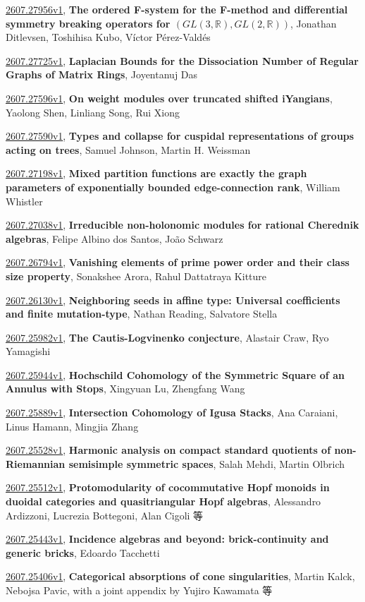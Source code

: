 \documentclass[9pt, a4paper]{article}
\theoremstyle{plain}
\theoremstyle{definition}
\theoremstyle{remark}
\newcommand{\arxiv}[3]{\href{https://arxiv.org/abs/#1}{#1}, \textbf{\textcolor{arxivblue}{#2}}, #3}
\begin{document}
\arxiv{2607.27956v1}{The ordered F-system for the F-method and differential symmetry breaking operators for $(GL(3,\mathbb{R}), GL(2,\mathbb{R}))$}{Jonathan Ditlevsen, Toshihisa Kubo, Víctor Pérez-Valdés}

\arxiv{2607.27725v1}{Laplacian Bounds for the Dissociation Number of Regular Graphs of Matrix Rings}{Joyentanuj Das}

\arxiv{2607.27596v1}{On weight modules over truncated shifted iYangians}{Yaolong Shen, Linliang Song, Rui Xiong}

\arxiv{2607.27590v1}{Types and collapse for cuspidal representations of groups acting on trees}{Samuel Johnson, Martin H. Weissman}

\arxiv{2607.27198v1}{Mixed partition functions are exactly the graph parameters of exponentially bounded edge-connection rank}{William Whistler}

\arxiv{2607.27038v1}{Irreducible non-holonomic modules for rational Cherednik algebras}{Felipe Albino dos Santos, João Schwarz}

\arxiv{2607.26794v1}{Vanishing elements of prime power order and their class size property}{Sonakshee Arora, Rahul Dattatraya Kitture}

\arxiv{2607.26130v1}{Neighboring seeds in affine type: Universal coefficients and finite mutation-type}{Nathan Reading, Salvatore Stella}

\arxiv{2607.25982v1}{The Cautis-Logvinenko conjecture}{Alastair Craw, Ryo Yamagishi}

\arxiv{2607.25944v1}{Hochschild Cohomology of the Symmetric Square of an Annulus with Stops}{Xingyuan Lu, Zhengfang Wang}

\arxiv{2607.25889v1}{Intersection Cohomology of Igusa Stacks}{Ana Caraiani, Linus Hamann, Mingjia Zhang}

\arxiv{2607.25528v1}{Harmonic analysis on compact standard quotients of non-Riemannian semisimple symmetric spaces}{Salah Mehdi, Martin Olbrich}

\arxiv{2607.25512v1}{Protomodularity of cocommutative Hopf monoids in duoidal categories and quasitriangular Hopf algebras}{Alessandro Ardizzoni, Lucrezia Bottegoni, Alan Cigoli 等}

\arxiv{2607.25443v1}{Incidence algebras and beyond: brick-continuity and generic bricks}{Edoardo Tacchetti}

\arxiv{2607.25406v1}{Categorical absorptions of cone singularities}{Martin Kalck, Nebojsa Pavic, with a joint appendix by Yujiro Kawamata 等}
\end{document}
